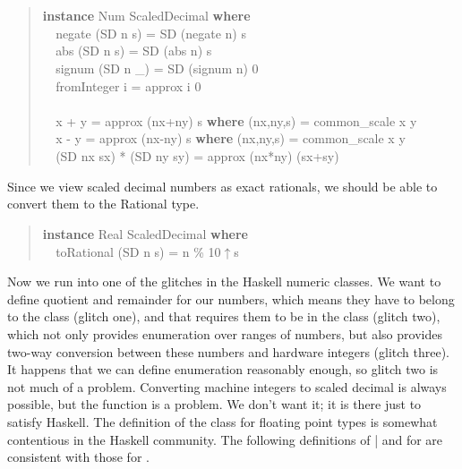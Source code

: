 \documentclass[prodmode,acmtoplas]{acmsmall}
\begin{document}
\begin{quote}
\begin{tabbing}
\sffamily \textbf{instance} Num ScaledDecimal \textbf{where}\\
\verb|  |\sffamily  negate (SD n s) = SD (negate n) s\\
\verb|  |\sffamily  abs    (SD n s) = SD (abs n)    s\\
\verb|  |\sffamily  signum (SD n \_) = SD (signum n) 0\\
\verb|  |\sffamily  fromInteger i   = approx i 0\\
\\
\verb|  |\sffamily  x + y = approx (nx+ny) s \textbf{where} (nx,ny,s) = common\_scale x y\\
\verb|  |\sffamily  x - y = approx (nx-ny) s \textbf{where} (nx,ny,s) = common\_scale x y\\
\verb|  |\sffamily  (SD nx sx) * (SD ny sy) = approx (nx*ny) (sx+sy)
\end{tabbing}
\end{quote}

Since we view scaled decimal numbers as exact rationals, we
should be able to convert them to the Rational type.

\begin{quote}
\begin{tabbing}
\sffamily \textbf{instance} Real ScaledDecimal \textbf{where}\\
\verb|  |\sffamily  toRational (SD n s) = n \% 10$\uparrow$s
\end{tabbing}
\end{quote}

Now we run into one of the glitches in the Haskell numeric
classes.  We want to define quotient and remainder for our
numbers, which means they have to belong to the  class
(glitch one), and that requires them to be in the  class
(glitch two), which not only provides enumeration over ranges
of numbers, but also provides two-way conversion between these
numbers and hardware integers (glitch three).
It happens that we can define enumeration reasonably enough,
so glitch two is not much of a problem.  Converting machine
integers to scaled decimal is always possible, but the
 function is a problem.  We don't want
it; it is there just to satisfy Haskell.
The definition of the  class for floating point types is
somewhat contentious in the Haskell community.  The following
definitions of | and  for
 are consistent with those for .
\end{document}
